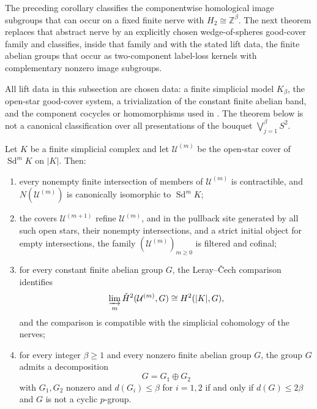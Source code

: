 The preceding corollary classifies the componentwise homological image subgroups that can occur on a fixed finite nerve with $H_2\cong \mathbb Z^\beta$. The next theorem replaces that abstract nerve by an explicitly chosen wedge-of-spheres good-cover family and classifies, inside that family and with the stated lift data, the finite abelian groups that occur as two-component label-loss kernels with complementary nonzero image subgroups.

All lift data in this subsection are chosen data: a finite simplicial
model $K_\beta$, the open-star good-cover system, a trivialization of the
constant finite abelian band, and the component cocycles or homomorphisms used in
. The theorem below is not a canonical
classification over all presentations of the bouquet $\bigvee_{j=1}^{\beta}S^2$.

\begin{lemma}\label{lem:wedge-sphere-cover-interface}
Let $K$ be a finite simplicial complex and let $\mathcal U^{(m)}$ be the open-star cover of $\operatorname{Sd}^m K$ on $|K|$. Then:
\begin{enumerate}[label=(\roman*),nosep]
\item every nonempty finite intersection of members of $\mathcal U^{(m)}$ is contractible, and $N(\mathcal U^{(m)})$ is canonically isomorphic to $\operatorname{Sd}^mK$;
\item the covers $\mathcal U^{(m+1)}$ refine $\mathcal U^{(m)}$, and in the pullback site generated by all such open stars, their nonempty intersections, and a strict initial object for empty intersections, the family $(\mathcal U^{(m)})_{m\ge0}$ is filtered and cofinal;
\item for every constant finite abelian group $G$, the Leray--\v{C}ech comparison identifies
\[
\varinjlim_m\check H^2(\mathcal U^{(m)},G)
\cong
H^2(|K|,G),
\]
and the comparison is compatible with the simplicial cohomology of the nerves;
\item for every integer $\beta\ge 1$ and every nonzero finite abelian group $G$, the
group $G$ admits a decomposition
\[
G=G_1\oplus G_2
\]
with $G_1,G_2$ nonzero and $d(G_i)\le\beta$ for $i=1,2$ if and only if $d(G)\le 2\beta$ and $G$ is not a cyclic $p$-group.
\end{enumerate}
\end{lemma}

